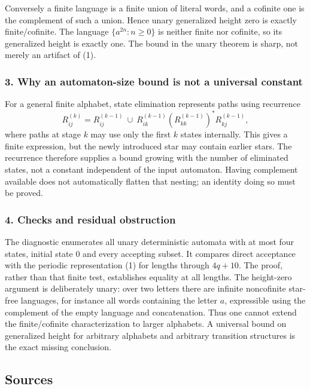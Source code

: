 \documentclass[11pt,a4paper]{article}
\begin{document}
Conversely a finite language is a finite union of literal words, and a cofinite one is the complement of such a union. Hence unary generalized height zero is exactly finite/cofinite. The language $\{a^{2n}:n\geq0\}$ is neither finite nor cofinite, so its generalized height is exactly one. The bound in the unary theorem is sharp, not merely an artifact of (1).

\subsubsection{3. Why an automaton-size bound is not a universal constant}
For a general finite alphabet, state elimination represents paths using recurrence
\[R^{(k)}_{ij}=R^{(k-1)}_{ij}\ \cup\
R^{(k-1)}_{ik}(R^{(k-1)}_{kk})^*R^{(k-1)}_{kj},\]
where paths at stage $k$ may use only the first $k$ states internally. This gives a finite expression, but the newly introduced star may contain earlier stars. The recurrence therefore supplies a bound growing with the number of eliminated states, not a constant independent of the input automaton. Having complement available does not automatically flatten that nesting; an identity doing so must be proved.

\subsubsection{4. Checks and residual obstruction}
The diagnostic enumerates all unary deterministic automata with at most four states, initial state 0 and every accepting subset. It compares direct acceptance with the periodic representation (1) for lengths through $4q+10$. The proof, rather than that finite test, establishes equality at all lengths. The height-zero argument is deliberately unary: over two letters there are infinite noncofinite star-free languages, for instance all words containing the letter $a$, expressible using the complement of the empty language and concatenation. Thus one cannot extend the finite/cofinite characterization to larger alphabets. A universal bound on generalized height for arbitrary alphabets and arbitrary transition structures is the exact missing conclusion.

\subsection{Sources}
\end{document}
